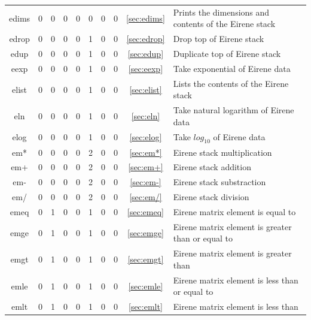 \documentclass[a4paper,10pt]{report}
\begin{document}
\begin{center}
\begin{longtable}{|c|c|c|c|c|c|c|c|c|l|}
    edims \index{b2plot, edims}    & 0 & 0 & 0 & 0 & 0 & 0 & 0 & \ref{sec:edims}    & Prints the dimensions and contents of the Eirene stack \\
    edrop \index{b2plot, edrop}    & 0 & 0 & 0 & 0 & 1 & 0 & 0 & \ref{sec:edrop}    & Drop top of Eirene stack \\
    edup \index{b2plot, edup}      & 0 & 0 & 0 & 0 & 1 & 0 & 0 & \ref{sec:edup}     & Duplicate top of Eirene stack \\
    eexp \index{b2plot, eexp}      & 0 & 0 & 0 & 0 & 1 & 0 & 0 & \ref{sec:eexp}     & Take exponential of Eirene data \\
    elist \index{b2plot, elist}    & 0 & 0 & 0 & 0 & 1 & 0 & 0 & \ref{sec:elist}    & Lists the contents of the Eirene stack \\
    eln \index{b2plot, eln}        & 0 & 0 & 0 & 0 & 1 & 0 & 0 & \ref{sec:eln}      & Take natural logarithm of Eirene data \\
    elog \index{b2plot, elog}      & 0 & 0 & 0 & 0 & 1 & 0 & 0 & \ref{sec:elog}     & Take $log_{10}$ of Eirene data \\
    em* \index{b2plot, em*}        & 0 & 0 & 0 & 0 & 2 & 0 & 0 & \ref{sec:em*}      & Eirene stack multiplication \\
    em+ \index{b2plot, em+}        & 0 & 0 & 0 & 0 & 2 & 0 & 0 & \ref{sec:em+}      & Eirene stack addition \\
    em- \index{b2plot, em-}        & 0 & 0 & 0 & 0 & 2 & 0 & 0 & \ref{sec:em-}      & Eirene stack substraction \\
    em/ \index{b2plot, em/}        & 0 & 0 & 0 & 0 & 2 & 0 & 0 & \ref{sec:em/}      & Eirene stack division \\
    emeq \index{b2plot, emeq}      & 0 & 1 & 0 & 0 & 1 & 0 & 0 & \ref{sec:emeq}     & Eirene matrix element is equal to \\
    emge \index{b2plot, emge}      & 0 & 1 & 0 & 0 & 1 & 0 & 0 & \ref{sec:emge}     & Eirene matrix element is greater than or equal to \\
    emgt \index{b2plot, emgt}      & 0 & 1 & 0 & 0 & 1 & 0 & 0 & \ref{sec:emgt}     & Eirene matrix element is greater than \\
    emle \index{b2plot, emle}      & 0 & 1 & 0 & 0 & 1 & 0 & 0 & \ref{sec:emle}     & Eirene matrix element is less than or equal to \\
    emlt \index{b2plot, emlt}      & 0 & 1 & 0 & 0 & 1 & 0 & 0 & \ref{sec:emlt}     & Eirene matrix element is less than \\

\end{longtable}
\end{center}
\end{document}
